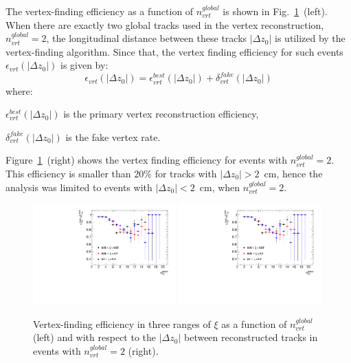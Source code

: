The vertex-finding efficiency as a function of $n^{global}_{vrt}$ is shown in  Fig.~\ref{fig:vertexEffi}~(left). When there are exactly two global tracks used in the vertex reconstruction, $n^{global}_{vrt}=2$, the longitudinal distance between these tracks $|\Delta z_0|$  is utilized by the vertex-finding algorithm. Since that, the vertex finding efficiency for such events $\epsilon_{vrt}\left(|\Delta z_0|\right)$ is given by:
\begin{equation}
\epsilon_{vrt}\left(|\Delta z_0|\right)=\epsilon_{vrt}^ {best}\left(|\Delta z_0|\right)+\delta_{vrt}^{fake}\left(|\Delta z_0|\right)
\end{equation}
where:
\begin{description}
	\item $\epsilon_{vrt}^ {best}\left(|\Delta z_0|\right)$ is the primary vertex reconstruction efficiency,
	\item $\delta_{vrt}^{fake}\left(|\Delta z_0|\right)$ is the fake vertex rate.
\end{description}
Figure~\ref{fig:vertexEffi}~(right) shows the vertex finding efficiency for events with $n^{global}_{vrt}=2$. This efficiency is smaller than $20\%$ for tracks with $|\Delta z_0|>2$~cm, hence the analysis was limited to  events with  $|\Delta z_0|<2$~cm, when $n^{global}_{vrt}=2$. 
\begin{figure}[h!]
	\centering
		\includegraphics[width=0.49\textwidth,page=1]{chapters/chrgSTAR/img/vertex/vertexEffi_ksi.pdf}
		\includegraphics[width=0.49\textwidth,page=8]{chapters/chrgSTAR/img/vertex/vertexEffi_ksi.pdf}
		\caption[Vertex-finding efficiency in three ranges of $\xi$ as a function of $n^{global}_{vrt}$ and with respect to the $|\Delta z_0|$ between reconstructed tracks in events with $n^{global}_{vrt}=2$]{Vertex-finding efficiency in three ranges of $\xi$ as a function of $n^{global}_{vrt}$ (left) and with respect to the $|\Delta z_0|$ between reconstructed tracks in events with $n^{global}_{vrt}=2$ (right). }
		\label{fig:vertexEffi}
\end{figure}

